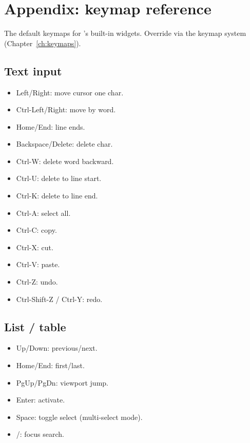 \chapter{Appendix: keymap reference}
\label{ch:keyref}

\begin{aside}
The default keymaps for \maya{}'s built-in widgets. Override
via the keymap system (Chapter~\ref{ch:keymaps}).
\end{aside}

\section{Text input}

\begin{itemize}[leftmargin=*]
  \item Left/Right: move cursor one char.
  \item Ctrl-Left/Right: move by word.
  \item Home/End: line ends.
  \item Backspace/Delete: delete char.
  \item Ctrl-W: delete word backward.
  \item Ctrl-U: delete to line start.
  \item Ctrl-K: delete to line end.
  \item Ctrl-A: select all.
  \item Ctrl-C: copy.
  \item Ctrl-X: cut.
  \item Ctrl-V: paste.
  \item Ctrl-Z: undo.
  \item Ctrl-Shift-Z / Ctrl-Y: redo.
\end{itemize}

\section{List / table}

\begin{itemize}[leftmargin=*]
  \item Up/Down: previous/next.
  \item Home/End: first/last.
  \item PgUp/PgDn: viewport jump.
  \item Enter: activate.
  \item Space: toggle select (multi-select mode).
  \item /: focus search.
\end{itemize}

